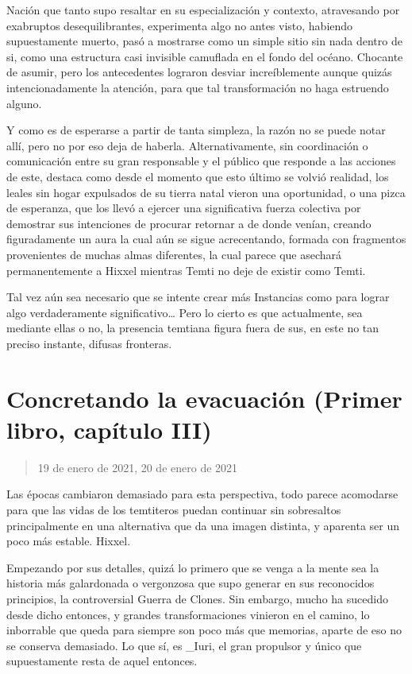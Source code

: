 \documentclass[
]{book}
\begin{document}
Nación que tanto supo resaltar en su especialización y contexto, atravesando por exabruptos desequilibrantes, experimenta algo no antes visto, habiendo supuestamente muerto, pasó a mostrarse como un simple sitio sin nada dentro de si, como una estructura casi invisible camuflada en el fondo del océano. Chocante de asumir, pero los antecedentes lograron desviar increíblemente aunque quizás intencionadamente la atención, para que tal transformación no haga estruendo alguno.

Y como es de esperarse a partir de tanta simpleza, la razón no se puede notar allí, pero no por eso deja de haberla. Alternativamente, sin coordinación o comunicación entre su gran responsable y el público que responde a las acciones de este, destaca como desde el momento que esto último se volvió realidad, los leales sin hogar expulsados de su tierra natal vieron una oportunidad, o una pizca de esperanza, que los llevó a ejercer una significativa fuerza colectiva por demostrar sus intenciones de procurar retornar a de donde venían, creando figuradamente un aura la cual aún se sigue acrecentando, formada con fragmentos provenientes de muchas almas diferentes, la cual parece que asechará permanentemente a Hixxel mientras Temti no deje de existir como Temti.

Tal vez aún sea necesario que se intente crear más Instancias como para lograr algo verdaderamente significativo\ldots{} Pero lo cierto es que actualmente, sea mediante ellas o no, la presencia temtiana figura fuera de sus, en este no tan preciso instante, difusas fronteras.

\hypertarget{concretando-la-evacuaciuxf3n-primer-libro-capuxedtulo-iii}{%
\section{Concretando la evacuación (Primer libro, capítulo III)}\label{concretando-la-evacuaciuxf3n-primer-libro-capuxedtulo-iii}}

\begin{quote}
19 de enero de 2021, 20 de enero de 2021
\end{quote}

Las épocas cambiaron demasiado para esta perspectiva, todo parece acomodarse para que las vidas de los temtiteros puedan continuar sin sobresaltos principalmente en una alternativa que da una imagen distinta, y aparenta ser un poco más estable. Hixxel.

Empezando por sus detalles, quizá lo primero que se venga a la mente sea la historia más galardonada o vergonzosa que supo generar en sus reconocidos principios, la controversial Guerra de Clones. Sin embargo, mucho ha sucedido desde dicho entonces, y grandes transformaciones vinieron en el camino, lo inborrable que queda para siempre son poco más que memorias, aparte de eso no se conserva demasiado. Lo que sí, es \_Iuri, el gran propulsor y único que supuestamente resta de aquel entonces.
\end{document}
